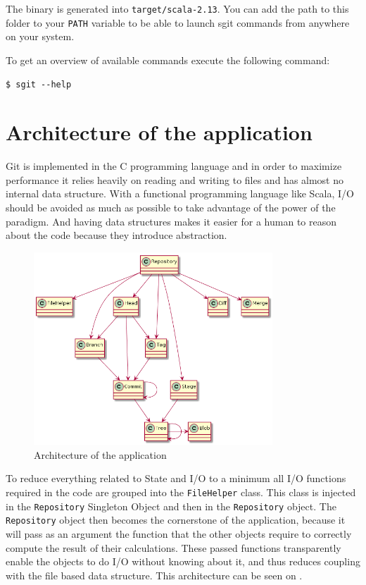 \documentclass[12pt,a4paper]{scrartcl}
\begin{document}
The binary is generated into \lstinline{target/scala-2.13}. You can add the
path to this folder to your \lstinline{PATH} variable to be able to launch sgit
commands from anywhere on your system.

To get an overview of available commands execute the following command:

\begin{lstlisting}
$ sgit --help
\end{lstlisting}

\section{Architecture of the application}
Git is implemented in the C programming language and in order to maximize
performance it relies heavily on reading and writing to files and has almost no
internal data structure. With a functional programming language like Scala, I/O
should be avoided as much as possible to take advantage of the power of the
paradigm. And having data structures makes it easier for a human to reason
about the code because they introduce abstraction.
\begin{figure}[h]
	\centering
	\includegraphics[width=0.8\textwidth]{img/diagram.png}
	\caption{Architecture of the application}
	\label{fig:architecture}
\end{figure}

To reduce everything related to State and I/O to a minimum all I/O functions
required in the code are grouped into the \lstinline{FileHelper} class. This
class is injected in the \lstinline{Repository} Singleton Object and then in the
\lstinline{Repository} object. The \lstinline{Repository} object then becomes
the cornerstone of the application, because it will pass as an argument the
function that the other objects require to correctly compute the result of
their calculations. These passed functions transparently enable the objects to
do I/O without knowing about it, and thus reduces coupling with the file based data
structure. This architecture can be seen on .
\end{document}
